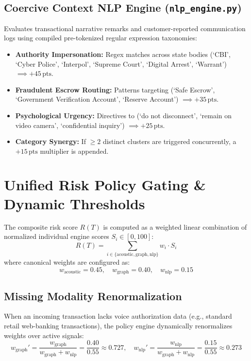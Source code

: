 \documentclass[11pt,a4paper]{article}
\begin{document}
\subsection{Coercive Context NLP Engine (\texttt{nlp\_engine.py})}
Evaluates transactional narrative remarks and customer-reported communication logs using compiled pre-tokenized regular expression taxonomies:
\begin{itemize}[leftmargin=1.8em, itemsep=2pt]
    \item \textbf{Authority Impersonation:} Regex matches across state bodies (`CBI', `Cyber Police', `Interpol', `Supreme Court', `Digital Arrest', `Warrant') $\implies +45\,\text{pts}$.
    \item \textbf{Fraudulent Escrow Routing:} Patterns targeting (`Safe Escrow', `Government Verification Account', `Reserve Account') $\implies +35\,\text{pts}$.
    \item \textbf{Psychological Urgency:} Directives to (`do not disconnect', `remain on video camera', `confidential inquiry') $\implies +25\,\text{pts}$.
    \item \textbf{Category Synergy:} If $\ge 2$ distinct clusters are triggered concurrently, a $+15\,\text{pts}$ multiplier is appended.
\end{itemize}

\section{Unified Risk Policy Gating \& Dynamic Thresholds}
\label{sec:policy}

The composite risk score $R(T)$ is computed as a weighted linear combination of normalized individual engine scores $S_i \in [0, 100]$:
\begin{equation}
    R(T) = \sum_{i \in \{\text{acoustic}, \text{graph}, \text{nlp}\}} w_i \cdot S_i
\end{equation}
where canonical weights are configured as:
\begin{equation}
    w_{\text{acoustic}} = 0.45, \quad w_{\text{graph}} = 0.40, \quad w_{\text{nlp}} = 0.15
\end{equation}

\subsection{Missing Modality Renormalization}
When an incoming transaction lacks voice authorization data (e.g., standard retail web-banking transactions), the policy engine dynamically renormalizes weights over active signals:
\begin{equation}
    w_{\text{graph}}' = \frac{w_{\text{graph}}}{w_{\text{graph}} + w_{\text{nlp}}} = \frac{0.40}{0.55} \approx 0.727, \quad
    w_{\text{nlp}}' = \frac{w_{\text{nlp}}}{w_{\text{graph}} + w_{\text{nlp}}} = \frac{0.15}{0.55} \approx 0.273
\end{equation}
\end{document}
